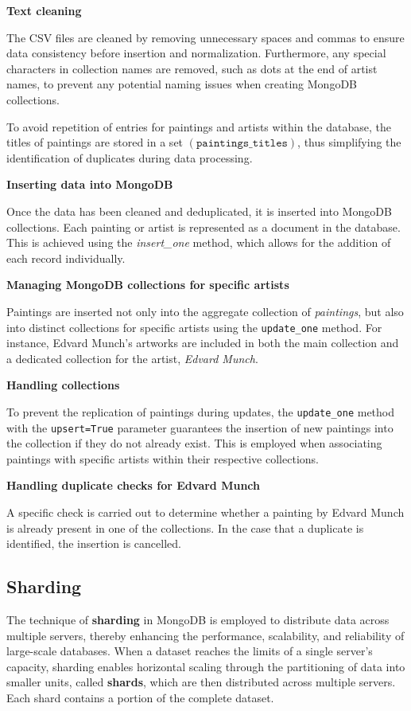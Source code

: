 \documentclass[a4paper,12pt]{article}
\begin{document}
\textbf{Text cleaning}

The CSV files are cleaned by removing unnecessary spaces and commas to ensure data consistency before insertion and normalization. Furthermore, any special characters in collection names are removed, such as dots at the end of artist names, to prevent any potential naming issues when creating MongoDB collections.

To avoid repetition of entries for paintings and artists within the database, the titles of paintings are stored in a set $\left(\texttt{paintings\_titles}\right)$, thus simplifying the identification of duplicates during data processing.

\textbf{Inserting data into MongoDB}

Once the data has been cleaned and deduplicated, it is inserted into MongoDB collections. Each painting or artist is represented as a document in the database. This is achieved using the \textit{insert\_one} method, which allows for the addition of each record individually.

\textbf{Managing MongoDB collections for specific artists}

Paintings are inserted not only into the aggregate collection of \textit{paintings}, but also into distinct collections for specific artists using the \texttt{update\_one} method. For instance, Edvard Munch's artworks are included in both the main collection and a dedicated collection for the artist, \textit{Edvard Munch}.

\textbf{Handling collections}

To prevent the replication of paintings during updates, the \texttt{update\_one} method with the \texttt{upsert=True} parameter guarantees the insertion of new paintings into the collection if they do not already exist. This is employed when associating paintings with specific artists within their respective collections.

\textbf{Handling duplicate checks for Edvard Munch}

A specific check is carried out to determine whether a painting by Edvard Munch is already present in one of the collections. In the case that a duplicate is identified, the insertion is cancelled.


\subsection{Sharding}
\justify

The technique of \textbf{sharding} in MongoDB is employed to distribute data across multiple servers, thereby enhancing the performance, scalability, and reliability of large-scale databases. When a dataset reaches the limits of a single server's capacity, sharding enables horizontal scaling through the partitioning of data into smaller units, called \textbf{shards}, which are then distributed across multiple servers. Each shard contains a portion of the complete dataset.
\end{document}
